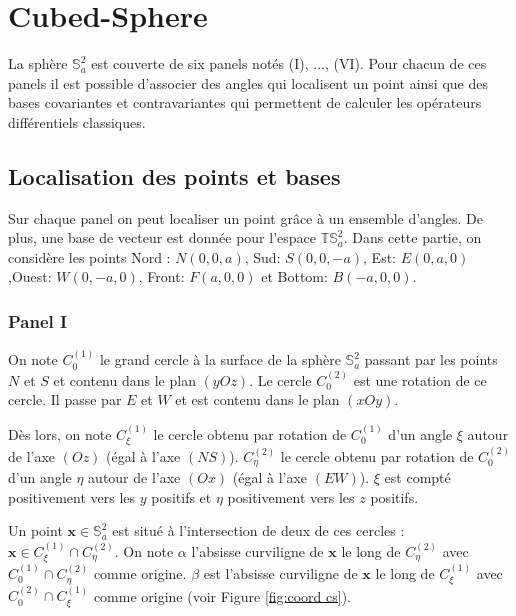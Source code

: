 \chapter{Cubed-Sphere}

La sphère $\mathbb{S}_a^2$ est couverte de six panels notés (I), ..., (VI). Pour chacun de ces panels il est possible d'associer des angles qui localisent un point ainsi que des bases covariantes et contravariantes qui permettent de calculer les opérateurs différentiels classiques.

\section{Localisation des points et bases}

Sur chaque panel on peut localiser un point grâce à un ensemble d'angles. De plus, une base de vecteur est donnée pour l'espace $\mathbb{T}\mathbb{S}_a^2$. Dans cette partie, on considère les points Nord : $N (0,0,a)$, Sud: $S (0,0,-a)$, Est: $E (0,a,0)$,Ouest: $W (0,-a,0)$, Front: $F(a,0,0)$ et Bottom: $B(-a,0,0)$. 

\subsection{Panel I}

On note $C_0^{(1)}$ le grand cercle à la surface de la sphère $\mathbb{S}_a^2$ passant par les points $N$ et $S$ et contenu dans le plan $(yOz)$. Le cercle $C_0^{(2)}$ est une rotation de ce cercle. Il passe par $E$ et $W$ et est contenu dans le plan $(xOy)$.

Dès lors, on note $C_{\xi}^{(1)}$ le cercle obtenu par rotation de $C_0^{(1)}$ d'un angle $\xi$ autour de l'axe $(Oz)$ (égal à l'axe $(NS)$). $C_{\eta}^{(2)}$ le cercle obtenu par rotation de $C_0^{(2)}$ d'un angle $\eta$ autour de l'axe $(Ox)$ (égal à l'axe $(EW)$). $\xi$ est compté positivement vers les $y$ positifs et $\eta$ positivement vers les $z$ positifs.

Un point $\mathbf{x} \in \mathbb{S}_a^2$ est situé à l'intersection de deux de ces cercles : $\mathbf{x} \in C_{\xi}^{(1)} \cap C_{\eta}^{(2)}$. On note $\alpha$ l'absisse curviligne de $\mathbf{x}$ le long de $C_{\eta}^{(2)}$ avec $C_{0}^{(1)}\cap C_{\eta}^{(2)}$ comme origine. $\beta$ est l'absisse curviligne de $\mathbf{x}$ le long de $C_{\xi}^{(1)}$ avec $C_{0}^{(2)}\cap C_{\xi}^{(1)}$ comme origine (voir Figure \ref{fig:coord cs}). 

